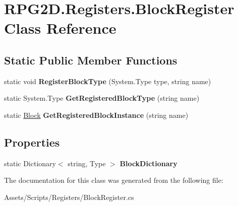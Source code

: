 \hypertarget{class_r_p_g2_d_1_1_registers_1_1_block_register}{}\section{R\+P\+G2\+D.\+Registers.\+Block\+Register Class Reference}
\label{class_r_p_g2_d_1_1_registers_1_1_block_register}
\subsection*{Static Public Member Functions}
\begin{DoxyCompactItemize}
\item 
\mbox{\label{class_r_p_g2_d_1_1_registers_1_1_block_register_a020af5a6f3796d8a206e788110362bcb}} 
static void {\bfseries Register\+Block\+Type} (System.\+Type type, string name)
\item 
\mbox{\label{class_r_p_g2_d_1_1_registers_1_1_block_register_a2ff9dc52c823f770544b86bbc860e326}} 
static System.\+Type {\bfseries Get\+Registered\+Block\+Type} (string name)
\item 
\mbox{\label{class_r_p_g2_d_1_1_registers_1_1_block_register_acf16a3d65525c7b45cc54318b88f6347}} 
static \mbox{\hyperlink{class_r_p_g2_d_1_1_base_classes_1_1_block}{Block}} {\bfseries Get\+Registered\+Block\+Instance} (string name)
\end{DoxyCompactItemize}
\subsection*{Properties}
\begin{DoxyCompactItemize}
\item 
\mbox{\label{class_r_p_g2_d_1_1_registers_1_1_block_register_a1c776fafc46f2711643b754cb2e245b6}} 
static Dictionary$<$ string, Type $>$ {\bfseries Block\+Dictionary}
\end{DoxyCompactItemize}


The documentation for this class was generated from the following file\+:\begin{DoxyCompactItemize}
\item 
Assets/\+Scripts/\+Registers/Block\+Register.\+cs\end{DoxyCompactItemize}

